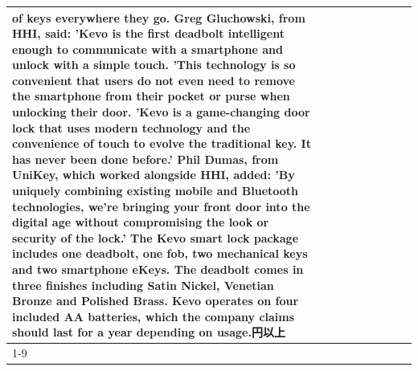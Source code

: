 \begin{table}[H]
\begin{tabular}{lllrlllll}
of keys everywhere they go. Greg Gluchowski, from HHI, said: 'Kevo is the first deadbolt intelligent enough to communicate with a smartphone and unlock with a simple touch. 'This technology is so convenient that users do not even need to remove the smartphone from their pocket or purse when unlocking their door. 'Kevo is a game-changing door lock that uses modern technology and the convenience of touch to evolve the traditional key. It has never been done before.' Phil Dumas, from UniKey, which worked alongside HHI, added: 'By uniquely combining existing mobile and Bluetooth technologies, we’re bringing your front door into the digital age without compromising the look or security of the lock.' The Kevo smart lock package includes one deadbolt, one fob, two mechanical keys and two smartphone eKeys. The deadbolt comes in three finishes including Satin Nickel, Venetian Bronze and Polished Brass. Kevo operates on four included AA batteries, which the company claims should last for a year depending on usage.円以上 \\
\cline{1-9}

\end{tabular}
\end{table}
